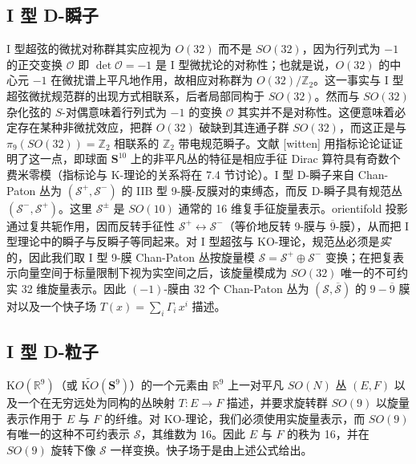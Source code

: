 \documentclass[11pt,a4paper]{ctexart}
\newcommand{\SrcRange}[2]{\marginpar{\raggedright\footnotesize 原文 p.#1}}
\begin{document}
\SrcRange{57}{57}
\subsection{I 型 D-瞬子}\label{i-ux578b-d-ux77acux5b50}

I 型超弦的微扰对称群其实应视为 \(O(32)\) 而不是 \(SO(32)\)，因为行列式为 \(-1\) 的正交变换 \({\mathcal O}\) 即 \(\det{\mathcal O}=-1\) 是 I 型微扰论的对称性；也就是说，\(O(32)\) 的中心元 \(-1\) 在微扰谱上平凡地作用，故相应对称群为 \(O(32)/{\mathbb{Z}}_2\)。这一事实与 I 型超弦微扰规范群的出现方式相联系，后者局部同构于 \(SO(32)\)。然而与 \(SO(32)\) 杂化弦的 \(S\)-对偶意味着行列式为 \(-1\) 的变换 \({\mathcal O}\) 其实并不是对称性。这便意味着必定存在某种非微扰效应，把群 \(O(32)\) 破缺到其连通子群 \(SO(32)\)，而这正是与 \(\pi_9(SO(32))={\mathbb{Z}}_2\) 相联系的 \({\mathbb{Z}}_2\) 带电规范瞬子。文献 [witten] 用指标论论证证明了这一点，即球面 \({\mathbf S}^{10}\) 上的非平凡丛的特征是相应手征 Dirac 算符具有奇数个费米零模（指标论与 K-理论的关系将在 7.4 节讨论）。I 型 D-瞬子来自 Chan-Paton 丛为 \(({\mathcal S}^+,{\mathcal S}^-)\) 的 IIB 型 9-膜-反膜对的束缚态，而反 D-瞬子具有规范丛 \(({\mathcal S}^-,{\mathcal S}^+)\)。这里 \({\mathcal S}^{\pm}\) 是 \(SO(10)\) 通常的 16 维复手征旋量表示。orientifold 投影通过复共轭作用，因而反转手征性 \({\mathcal S}^+\leftrightarrow {\mathcal S}^-\)（等价地反转 9-膜与 \(\overline{9}\)-膜），从而把 I 型理论中的瞬子与反瞬子等同起来。对 I 型超弦与 KO-理论，规范丛必须是\emph{实}的，因此我们取 I 型 9-膜 Chan-Paton 丛按旋量模 \({\mathcal S}={\mathcal S}^+\oplus {\mathcal S}^-\) 变换；在把复表示向量空间于标量限制下视为实空间之后，该旋量模成为 \(SO(32)\) 唯一的不可约实 32 维旋量表示。因此 \((-1)\)-膜由 32 个 Chan-Paton 丛为 \(({\mathcal S},\overline{\mathcal S})\) 的 \(9-\overline{9}\) 膜对以及一个快子场 \(T(x)=\sum_i\Gamma_i\,x^i\) 描述。

\SrcRange{57}{57}
\subsection{I 型 D-粒子}\label{i-ux578b-d-ux7c92ux5b50}

\({\mathrm KO}({\mathbb{R}}^9)\)（或 \(\widetilde{{\mathrm KO}}({\mathbf S}^9)\)）的一个元素由 \({\mathbb{R}}^9\) 上一对平凡 \(SO(N)\) 丛 \((E,F)\) 以及一个在无穷远处为同构的丛映射 \(T:E\rightarrow F\) 描述，并要求旋转群 \(SO(9)\) 以旋量表示作用于 \(E\) 与 \(F\) 的纤维。对 KO-理论，我们必须使用实旋量表示，而 \(SO(9)\) 有唯一的这种不可约表示 \({\mathcal S}\)，其维数为 16。因此 \(E\) 与 \(F\) 的秩为 16，并在 \(SO(9)\) 旋转下像 \({\mathcal S}\) 一样变换。快子场于是由上述公式给出。
\end{document}
